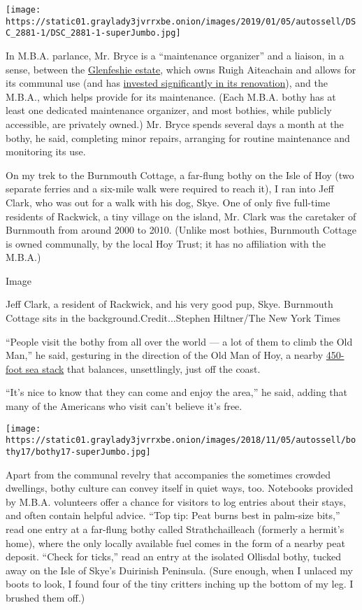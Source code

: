 \texttt{[image: https://static01.graylady3jvrrxbe.onion/images/2019/01/05/autossell/DSC\_2881-1/DSC\_2881-1-superJumbo.jpg]}

In M.B.A. parlance, Mr. Bryce is a ``maintenance organizer'' and a
liaison, in a sense, between the
\href{http://www.glenfeshie.scot/Glenfeshie/Glenfeshie_Estate_Welcome.html}{Glenfeshie
estate}, which owns Ruigh Aiteachain and allows for its communal use
(and has
\href{https://jamescarron.wordpress.com/features/the-new-ruigh-aiteachain/}{invested
significantly in its renovation}), and the M.B.A., which helps provide
for its maintenance. (Each M.B.A. bothy has at least one dedicated
maintenance organizer, and most bothies, while publicly accessible, are
privately owned.) Mr. Bryce spends several days a month at the bothy, he
said, completing minor repairs, arranging for routine maintenance and
monitoring its use.

On my trek to the Burnmouth Cottage, a far-flung bothy on the Isle of
Hoy (two separate ferries and a six-mile walk were required to reach
it), I ran into Jeff Clark, who was out for a walk with his dog, Skye.
One of only five full-time residents of Rackwick, a tiny village on the
island, Mr. Clark was the caretaker of Burnmouth from around 2000 to
2010. (Unlike most bothies, Burnmouth Cottage is owned communally, by
the local Hoy Trust; it has no affiliation with the M.B.A.)

Image

Jeff Clark, a resident of Rackwick, and his very good pup, Skye.
Burnmouth Cottage sits in the background.Credit...Stephen Hiltner/The
New York Times

``People visit the bothy from all over the world --- a lot of them to
climb the Old Man,'' he said, gesturing in the direction of the Old Man
of Hoy, a nearby
\href{https://hoyorkney.com/attractions/hoy-geography/old-man-of-hoy/}{450-foot
sea stack} that balances, unsettlingly, just off the coast.

``It's nice to know that they can come and enjoy the area,'' he said,
adding that many of the Americans who visit can't believe it's free.

\texttt{[image: https://static01.graylady3jvrrxbe.onion/images/2018/11/05/autossell/bothy17/bothy17-superJumbo.jpg]}

Apart from the communal revelry that accompanies the sometimes crowded
dwellings, bothy culture can convey itself in quiet ways, too. Notebooks
provided by M.B.A. volunteers offer a chance for visitors to log entries
about their stays, and often contain helpful advice. ``Top tip: Peat
burns best in palm-size bits,'' read one entry at a far-flung bothy
called Strathchailleach (formerly a hermit's home), where the only
locally available fuel comes in the form of a nearby peat deposit.
``Check for ticks,'' read an entry at the isolated Ollisdal bothy,
tucked away on the Isle of Skye's Duirinish Peninsula. (Sure enough,
when I unlaced my boots to look, I found four of the tiny critters
inching up the bottom of my leg. I brushed them off.)

